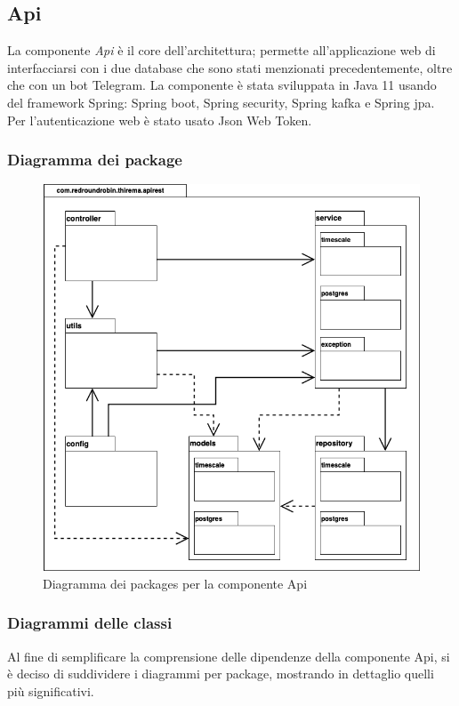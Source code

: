 \subsection{Api}
	La componente \textit{Api} è il core dell'architettura; permette all'applicazione web di interfacciarsi con i due database che sono stati menzionati precedentemente, oltre che con un bot Telegram.
	La componente è stata sviluppata in Java 11 usando del framework Spring: Spring boot, Spring security, Spring kafka e Spring jpa. Per l'autenticazione web è stato usato Json Web Token.

	\subsubsection{Diagramma dei package}%
		\begin{figure}[H]
			\centering
			\includegraphics[scale=0.500]{res/images/API/packageAPI.png}
			\caption{Diagramma dei packages per la componente Api}
		\end{figure}

	\subsubsection{Diagrammi delle classi}%
		Al fine di semplificare la comprensione delle dipendenze della componente Api, si è deciso di suddividere i diagrammi per package, mostrando in dettaglio quelli più significativi.


